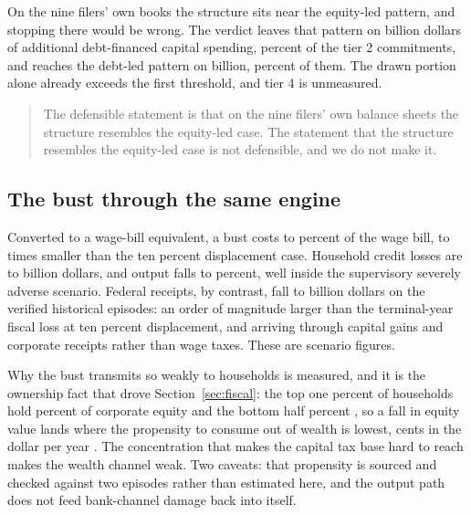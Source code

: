 On the nine filers' own books the structure sits near the equity-led pattern, and stopping there
would be wrong. The verdict leaves that pattern on  billion dollars of
additional debt-financed capital spending,  percent of the tier 2
commitments, and reaches the debt-led pattern on  billion,
 percent of them. The drawn portion alone already exceeds the first
threshold, and tier 4 is unmeasured.

\begin{quote}
The defensible statement is that on the nine filers' own balance sheets the structure resembles
the equity-led case. The statement that the structure resembles the equity-led case is not
defensible, and we do not make it.
\end{quote}

\subsection{The bust through the same engine}

Converted to a wage-bill equivalent, a bust costs  to 
percent of the wage bill,  to  times smaller than the
ten percent displacement case. Household credit losses are  to
 billion dollars, and output falls  to
 percent, well inside the supervisory severely adverse scenario. Federal
receipts, by contrast, fall  to  billion dollars
on the verified historical episodes: an order of magnitude larger than the terminal-year fiscal
loss at ten percent displacement, and arriving through capital gains and corporate receipts rather
than wage taxes. These are scenario figures.

Why the bust transmits so weakly to households is measured, and it is the ownership fact that drove
Section~\ref{sec:fiscal}: the top one percent of households hold  percent
of corporate equity and the bottom half  percent \citep{FRBDFA}, so a
fall in equity value lands where the propensity to consume out of wealth is lowest,
 cents in the dollar per year \citep{ChodorowReichNenovSimsek2021}. The
concentration that makes the capital tax base hard to reach makes the wealth channel weak. Two
caveats: that propensity is sourced and checked against two episodes rather than estimated here,
and the output path does not feed bank-channel damage back into itself.

